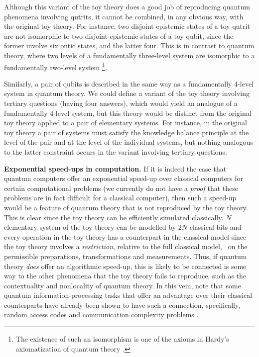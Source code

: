 \documentclass[pra,twocolumn,nofootinbib,showpacs]{revtex4}
\begin{document}
Although this variant of the toy theory does a good job of reproducing
quantum phenomena involving qutrits, it cannot be combined, in any obvious
way, with the original toy theory. For instance, two disjoint epistemic
states of a toy qutrit are not isomorphic to two disjoint epistemic states
of a toy qubit, since the former involve six ontic states, and the latter
four. This is in contrast to quantum theory, where two levels of a
fundamentally three-level system are isomorphic to a fundamentally two-level
system \footnote{%
The existence of such an isomorphism is one of the axioms in Hardy's
axiomatization of quantum theory \cite{Hardyaxioms}.}.

Similarly, a pair of qubits is described in the same way as a fundamentally
4-level system in quantum theory. We could define a variant of the toy
theory involving tertiary questions (having four answers), which would yield
an analogue of a fundamentally 4-level system, but this theory would be
distinct from the original toy theory applied to a pair of elementary
systems. For instance, in the original toy theory a pair of systems must
satisfy the knowledge balance principle at the level of the pair and at the
level of the individual systems, but nothing analogous to the latter
constraint occurs in the variant involving tertiary questions.

\textbf{Exponential speed-ups in computation. }If it is indeed the case that
quantum computers offer an exponential speed-up over classical computers for
certain computational problems \cite{NielsenChuang} (we currently do not
have a \emph{proof} that these problems are in fact difficult for a
classical computer), then such a speed-up would be a feature of quantum
theory that is not reproduced by the toy theory. This is clear since the toy
theory can be efficiently simulated classically. $N$ elementary system of
the toy theory can be modelled by $2N$ classical bits and every operation in
the toy theory has a counterpart in the classical model since the toy theory
involves a \emph{restriction}, relative to the full classical model,\emph{\ }%
on the permissible preparations, transformations and measurements.
Thus, if quantum theory \emph{does} offer an algorithmic speed-up,
this is likely to be connected is some way to the other phenomena
that the toy theory fails to reproduce, such as the contextuality
and nonlocality of quantum theory. In this vein, note that some
quantum information-processing tasks that offer an advantage over
their classical counterparts have already been
shown to have such a connection, specifically, random access codes \cite%
{Galvao} and communication complexity problems \cite{BZPZ}.
\end{document}
